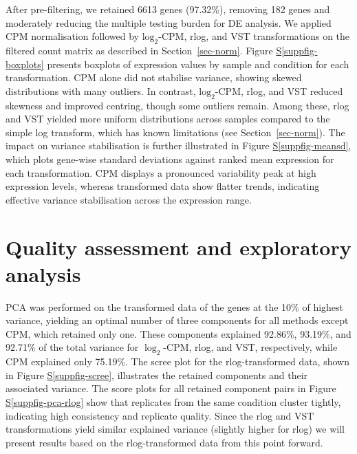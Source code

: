 \documentclass[
  a4paper,
]{scrreprt}
\newcommand*\quartosuppfigref[1]{Figure \hyperref[#1]{S\ref{#1}}}
\begin{document}
After pre-filtering, we retained 6613 genes (97.32\%), removing 182
genes and moderately reducing the multiple testing burden for DE
analysis. We applied CPM normalisation followed by \(\text{log}_2\)-CPM,
rlog, and VST transformations on the filtered count matrix as described
in Section~\ref{sec-norm}. \quartosuppfigref{suppfig-boxplots} presents
boxplots of expression values by sample and condition for each
transformation. CPM alone did not stabilise variance, showing skewed
distributions with many outliers. In contrast, \(\text{log}_2\)-CPM,
rlog, and VST reduced skewness and improved centring, though some
outliers remain. Among these, rlog and VST yielded more uniform
distributions across samples compared to the simple log transform, which
has known limitations (see Section~\ref{sec-norm}). The impact on
variance stabilisation is further illustrated in
\quartosuppfigref{suppfig-meansd}, which plots gene-wise standard
deviations against ranked mean expression for each transformation. CPM
displays a pronounced variability peak at high expression levels,
whereas transformed data show flatter trends, indicating effective
variance stabilisation across the expression range.

\section{Quality assessment and exploratory
analysis}\label{quality-assessment-and-exploratory-analysis}

PCA was performed on the transformed data of the genes at the 10\% of
highest variance, yielding an optimal number of three components for all
methods except CPM, which retained only one. These components explained
92.86\%, 93.19\%, and 92.71\% of the total variance for \(\log_2\)-CPM,
rlog, and VST, respectively, while CPM explained only 75.19\%. The scree
plot for the rlog-transformed data, shown in
\quartosuppfigref{suppfig-scree}, illustrates the retained components
and their associated variance. The score plots for all retained
component pairs in \quartosuppfigref{suppfig-pca-rlog} show that
replicates from the same condition cluster tightly, indicating high
consistency and replicate quality. Since the rlog and VST
transformations yield similar explained variance (slightly higher for
rlog) we will present results based on the rlog-transformed data from
this point forward.
\end{document}
